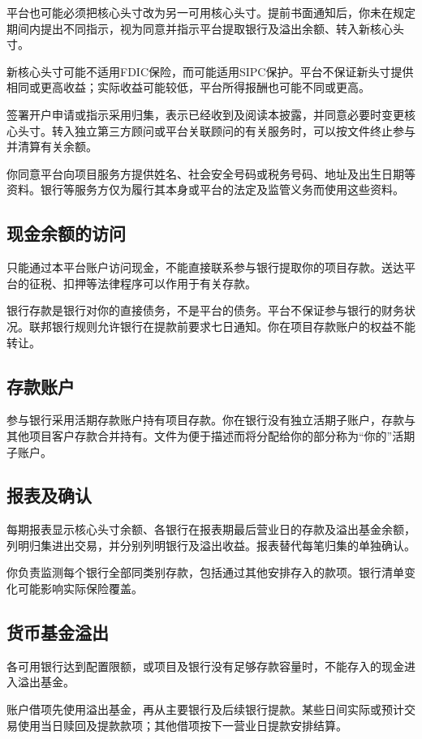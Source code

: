 \documentclass[UTF8,fontset=none,11pt,a4paper]{ctexart}
\begin{document}
平台也可能必须把核心头寸改为另一可用核心头寸。提前书面通知后，你未在规定期间内提出不同指示，视为同意并指示平台提取银行及溢出余额、转入新核心头寸。


新核心头寸可能不适用FDIC保险，而可能适用SIPC保护。平台不保证新头寸提供相同或更高收益；实际收益可能较低，平台所得报酬也可能不同或更高。


签署开户申请或指示采用归集，表示已经收到及阅读本披露，并同意必要时变更核心头寸。转入独立第三方顾问或平台关联顾问的有关服务时，可以按文件终止参与并清算有关余额。


你同意平台向项目服务方提供姓名、社会安全号码或税务号码、地址及出生日期等资料。银行等服务方仅为履行其本身或平台的法定及监管义务而使用这些资料。


\subsection*{现金余额的访问}
只能通过本平台账户访问现金，不能直接联系参与银行提取你的项目存款。送达平台的征税、扣押等法律程序可以作用于有关存款。


银行存款是银行对你的直接债务，不是平台的债务。平台不保证参与银行的财务状况。联邦银行规则允许银行在提款前要求七日通知。你在项目存款账户的权益不能转让。


\subsection*{存款账户}
参与银行采用活期存款账户持有项目存款。你在银行没有独立活期子账户，存款与其他项目客户存款合并持有。文件为便于描述而将分配给你的部分称为“你的”活期子账户。


\subsection*{报表及确认}
每期报表显示核心头寸余额、各银行在报表期最后营业日的存款及溢出基金余额，列明归集进出交易，并分别列明银行及溢出收益。报表替代每笔归集的单独确认。


你负责监测每个银行全部同类别存款，包括通过其他安排存入的款项。银行清单变化可能影响实际保险覆盖。


\subsection*{货币基金溢出}
各可用银行达到配置限额，或项目及银行没有足够存款容量时，不能存入的现金进入溢出基金。


账户借项先使用溢出基金，再从主要银行及后续银行提款。某些日间实际或预计交易使用当日赎回及提款款项；其他借项按下一营业日提款安排结算。
\end{document}
